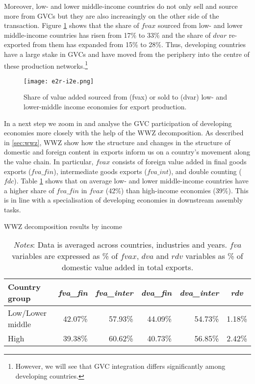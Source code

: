 \documentclass[a4paper,11pt]{article}
\begin{document}
Moreover, low- and lower middle-income countries do not only sell and source more from GVCs but they are also increasingly on the other side of the transaction. Figure \ref{fig:llmpartner} shows that the share of $fvax$ sourced from low- and lower middle-income countries has risen from 17\% to 33\% and the share of $dvar$ re-exported from them has expanded from 15\% to 28\%. Thus, developing countries have a large stake in GVCs and have moved from the periphery into the centre of these production networks.\footnote{However, we will see that GVC integration differs significantly among developing countries.}

\begin{figure}[h]
\centering
\texttt{[image: e2r-i2e.png]}
\caption{Share of value added sourced from (fvax) or sold to (dvar) low- and lower-middle income economies for export production.}
\label{fig:llmpartner}
\end{figure}

In a next step we zoom in and analyse the GVC participation of developing economies more closely with the help of the WWZ decomposition. As described in \cref{sec:wwz}, WWZ show how the structure and changes in the structure of domestic and foreign content in exports inform us on a country's movement along the value chain. In particular, $fvax$ consists of foreign value added in final goods exports ($fva\_fin$), intermediate goods exports ($fva\_int$), and double counting ($fdc$). Table \ref{tab:wwz} shows that on average low- and lower middle-income countries have a higher share of $fva\_fin$ in $fvax$ (42\%) than high-income economies (39\%). This is in line with a specialisation of developing economies in downstream assembly tasks.

\begin{table}[t!]\small
  \centering
  \caption{WWZ decomposition results by income}
    \begin{tabular}{lrrrrr}
    \toprule
    Country group & \multicolumn{1}{c}{\textit{fva\_fin}} & \multicolumn{1}{c}{\textit{fva\_inter}} & \multicolumn{1}{c}{\textit{dva\_fin}} & \multicolumn{1}{c}{\textit{dva\_inter}} & \multicolumn{1}{c}{\textit{rdv}} \\
    \midrule
    Low/Lower middle & 42.07\% & 57.93\% & 44.09\% & 54.73\% & 1.18\% \\
    High  & 39.38\% & 60.62\% & 40.73\% & 56.85\% & 2.42\% \\
    \bottomrule
    \end{tabular}
  \label{tab:wwz}
  \caption*{\textit{Notes}: Data is averaged across countries, industries and years. $fva$ variables are expressed as \% of $fvax$, $dva$ and $rdv$ variables as \% of domestic value added in total exports.}
\end{table}
\end{document}
